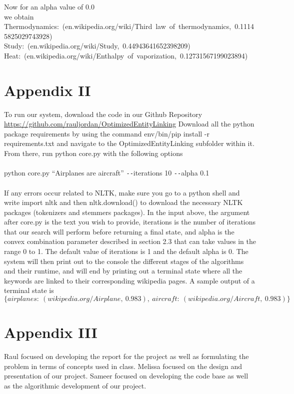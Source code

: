 \documentclass[twoside,11pt]{article}
\begin{document}
Now for an alpha value of 0.0
\\
we obtain
\mbox{Thermodynamics: (en.wikipedia.org/wiki/Third law of thermodynamics, 0.11145825029743928)}
\\
\mbox{Study: (en.wikipedia.org/wiki/Study, 0.44943641652398209)}
\\
\mbox{Heat: (en.wikipedia.org/wiki/Enthalpy of vaporization, 0.12731567199023894)}

\section{Appendix II}
To run our system, download the code in our Github Repository
 \url{https://github.com/rauljordan/OptimizedEntityLinking} Download all the python package requirements by using the command env/bin/pip install -r requirements.txt and navigate to the OptimizedEntityLinking subfolder within it. From there, run python core.py with the following options
\\ \\
python core.py ``Airplanes are aircraft'' \texttt{-{}-}iterations 10 \texttt{-{}-}alpha 0.1
\\ \\
If any errors occur related to NLTK, make sure you go to a python shell and write import nltk and then nltk.download() to download the necessary NLTK packages (tokenizers and stemmers packages). In the input above, the argument after core.py is the text you wish to provide, iterations is the number of iterations that our search will perform before returning a final state, and alpha is the convex combination parameter described in section 2.3 that can take values in the range 0 to 1. The default value of iterations is 1 and the default alpha is 0. The system will then print out to the console the different stages of the algorithms and their runtime, and will end by printing out a terminal state where all the keywords are linked to their corresponding wikipedia pages. A sample output of a terminal state is
$$\{airplanes: \ (wikipedia.org/Airplane, \ 0.983), \ aircraft: \ (wikipedia.org/Aircraft, \ 0.983)\}$$
\section{Appendix III}
Raul focused on developing the report for the project as well as formulating the problem in terms of concepts used in class. Melissa focused on the design and presentation of our project. Sameer focused on developing the code base as well as the algorithmic development of our project.
\end{document}
